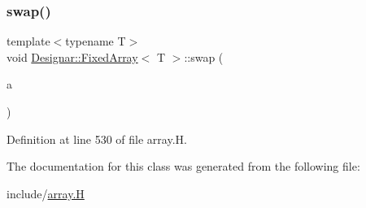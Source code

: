 \subsubsection{\texorpdfstring{swap()}{swap()}}
{\footnotesize\ttfamily template$<$typename T$>$ \\
void \hyperlink{class_designar_1_1_fixed_array}{Designar\+::\+Fixed\+Array}$<$ T $>$\+::swap (\begin{DoxyParamCaption}\item[{\hyperlink{class_designar_1_1_fixed_array}{Fixed\+Array}$<$ T $>$ \&}]{a }\end{DoxyParamCaption})\hspace{0.3cm}{\ttfamily [inline]}}



Definition at line 530 of file array.\+H.



The documentation for this class was generated from the following file\+:\begin{DoxyCompactItemize}
\item 
include/\hyperlink{array_8_h}{array.\+H}\end{DoxyCompactItemize}
